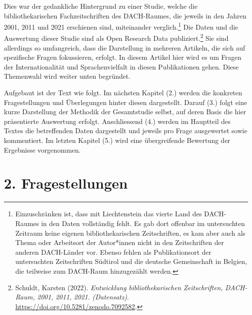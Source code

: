\documentclass[a4paper,
fontsize=11pt,
oneside,
numbers=noperiodatend,
parskip=half-,
bibliography=totoc,
final
]{scrartcl}
\begin{document}
Dies war der gedankliche Hintergrund zu einer Studie, welche die
bibliothekarischen Fachzeitschriften des DACH-Raumes, die jeweils in den
Jahren 2001, 2011 und 2021 erschienen sind, miteinander
verglich.\footnote{Einzuschränken ist, dass mit Liechtenstein das vierte
  Land des DACH-Raumes in den Daten vollständig fehlt. Es gab dort
  offenbar im untersuchten Zeitraum keine eigenen bibliothekarischen
  Zeitschriften, es kam aber auch als Thema oder Arbeitsort der
  Autor*innen nicht in den Zeitschriften der anderen DACH-Länder vor.
  Ebenso fehlen als Publikationsort der untersuchten Zeitschriften
  Südtirol und die deutsche Gemeinschaft in Belgien, die teilweise zum
  DACH-Raum hinzugezählt werden.} Die Daten und die Auswertung dieser
Studie sind als Open Research Data publiziert.\footnote{Schuldt, Karsten
  (2022). \emph{Entwicklung bibliothekarischen Zeitschriften, DACH-Raum,
  2001, 2011, 2021. (Datensatz)}.
  \url{https://doi.org/10.5281/zenodo.7092582}.} Sie sind allerdings so
umfangreich, dass die Darstellung in mehreren Artikeln, die sich auf
spezifische Fragen fokussieren, erfolgt. In diesem Artikel hier wird es
um Fragen der Internationalität und Sprachenvielfalt in diesen
Publikationen gehen. Diese Themenwahl wird weiter unten begründet.

Aufgebaut ist der Text wie folgt. Im nächsten Kapitel (2.) werden die
konkreten Fragestellungen und Überlegungen hinter diesen dargestellt.
Darauf (3.) folgt eine kurze Darstellung der Methodik der Gesamtstudie
selbst, auf deren Basis die hier präsentierte Auswertung erfolgt.
Anschliessend (4.) werden im Hauptteil des Textes die betreffenden Daten
dargestellt und jeweils pro Frage ausgewertet sowie kommentiert. Im
letzten Kapitel (5.) wird eine übergreifende Bewertung der Ergebnisse
vorgenommen.

\hypertarget{fragestellungen}{%
\section{2. Fragestellungen}\label{fragestellungen}}
\end{document}
